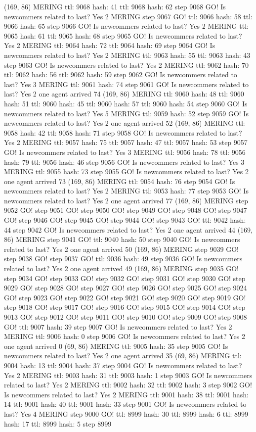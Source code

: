 (169, 86) MERING ttl: 9068 hash: 41 ttl: 9068 hash: 62 step 9068 GO! Is newcommers related to last? Yes 2 MERING step 9067 GO! ttl: 9066 hash: 58 ttl: 9066 hash: 65 step 9066 GO! Is newcommers related to last? Yes 2 MERING ttl: 9065 hash: 61 ttl: 9065 hash: 68 step 9065 GO! Is newcommers related to last? Yes 2 MERING ttl: 9064 hash: 72 ttl: 9064 hash: 69 step 9064 GO! Is newcommers related to last? Yes 2 MERING ttl: 9063 hash: 55 ttl: 9063 hash: 43 step 9063 GO! Is newcommers related to last? Yes 2 MERING ttl: 9062 hash: 70 ttl: 9062 hash: 56 ttl: 9062 hash: 59 step 9062 GO! Is newcommers related to last? Yes 3 MERING ttl: 9061 hash: 74 step 9061 GO! Is newcommers related to last? Yes 2 one agent arrived 74 (169, 86) MERING ttl: 9060 hash: 48 ttl: 9060 hash: 51 ttl: 9060 hash: 45 ttl: 9060 hash: 57 ttl: 9060 hash: 54 step 9060 GO! Is newcommers related to last? Yes 5 MERING ttl: 9059 hash: 52 step 9059 GO! Is newcommers related to last? Yes 2 one agent arrived 52 (169, 86) MERING ttl: 9058 hash: 42 ttl: 9058 hash: 71 step 9058 GO! Is newcommers related to last? Yes 2 MERING ttl: 9057 hash: 75 ttl: 9057 hash: 47 ttl: 9057 hash: 53 step 9057 GO! Is newcommers related to last? Yes 3 MERING ttl: 9056 hash: 78 ttl: 9056 hash: 79 ttl: 9056 hash: 46 step 9056 GO! Is newcommers related to last? Yes 3 MERING ttl: 9055 hash: 73 step 9055 GO! Is newcommers related to last? Yes 2 one agent arrived 73 (169, 86) MERING ttl: 9054 hash: 76 step 9054 GO! Is newcommers related to last? Yes 2 MERING ttl: 9053 hash: 77 step 9053 GO! Is newcommers related to last? Yes 2 one agent arrived 77 (169, 86) MERING step 9052 GO! step 9051 GO! step 9050 GO! step 9049 GO! step 9048 GO! step 9047 GO! step 9046 GO! step 9045 GO! step 9044 GO! step 9043 GO! ttl: 9042 hash: 44 step 9042 GO! Is newcommers related to last? Yes 2 one agent arrived 44 (169, 86) MERING step 9041 GO! ttl: 9040 hash: 50 step 9040 GO! Is newcommers related to last? Yes 2 one agent arrived 50 (169, 86) MERING step 9039 GO! step 9038 GO! step 9037 GO! ttl: 9036 hash: 49 step 9036 GO! Is newcommers related to last? Yes 2 one agent arrived 49 (169, 86) MERING step 9035 GO! step 9034 GO! step 9033 GO! step 9032 GO! step 9031 GO! step 9030 GO! step 9029 GO! step 9028 GO! step 9027 GO! step 9026 GO! step 9025 GO! step 9024 GO! step 9023 GO! step 9022 GO! step 9021 GO! step 9020 GO! step 9019 GO! step 9018 GO! step 9017 GO! step 9016 GO! step 9015 GO! step 9014 GO! step 9013 GO! step 9012 GO! step 9011 GO! step 9010 GO! step 9009 GO! step 9008 GO! ttl: 9007 hash: 39 step 9007 GO! Is newcommers related to last? Yes 2 MERING ttl: 9006 hash: 0 step 9006 GO! Is newcommers related to last? Yes 2 one agent arrived 0 (69, 86) MERING ttl: 9005 hash: 35 step 9005 GO! Is newcommers related to last? Yes 2 one agent arrived 35 (69, 86) MERING ttl: 9004 hash: 13 ttl: 9004 hash: 37 step 9004 GO! Is newcommers related to last? Yes 2 MERING ttl: 9003 hash: 31 ttl: 9003 hash: 1 step 9003 GO! Is newcommers related to last? Yes 2 MERING ttl: 9002 hash: 32 ttl: 9002 hash: 3 step 9002 GO! Is newcommers related to last? Yes 2 MERING ttl: 9001 hash: 38 ttl: 9001 hash: 14 ttl: 9001 hash: 40 ttl: 9001 hash: 33 step 9001 GO! Is newcommers related to last? Yes 4 MERING step 9000 GO! ttl: 8999 hash: 30 ttl: 8999 hash: 6 ttl: 8999 hash: 17 ttl: 8999 hash: 5 step 8999 